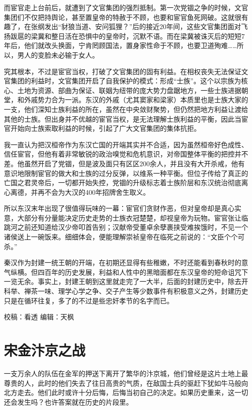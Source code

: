 \documentclass[
]{book}
\begin{document}
而宦官走上台前后，就遭到了文官集团的强烈抵制。第一次党锢之争的时候，文官集团们不仅把持舆论，甚至置皇帝的特赦于不顾，也要和宦官鱼死网破。这就很有趣了，在张纲发出``豺狼当道、安问狐狸？''后的接近20年间，这些文官集团面对飞扬跋扈的梁冀和整日活在恐惧中的皇帝时，沉默不语。而在梁冀被诛灭后的短短7年后，他们就改头换面，宁肯罔顾国法，置身家性命于不顾，也要卫道殉难\ldots\ldots 所以，男人的变脸未必输于女人。

究其根本，不过是宦官当权，打破了文官集团的固有利益。在相权丧失无法保证文官集团的利益时，文官集团开启了自我保护的模式：形成``士族''。这个以宗族为核心、土地为资源、部曲为保证、联姻为纽带的庞大势力盘踞地方，一些士族进据朝堂，和外戚势力合为一派。东汉的外戚（尤其窦家和梁家）本质里也是士族大家的一支，他们深知士族利益的所在，虽然在中央敛财聚势，但仍然把地方利益让渡给其他的士族。但出身并不优越的宦官当权，是无法理解士族利益的平衡，因此当宦官开始向士族索取利益的时候，引起了广大文官集团的集体抗拒。

我一直认为把汉桓帝作为东汉亡国的开端其实并不合适，因为虽然桓帝好色成性、信任宦官，但他有着非常敏锐的政治嗅觉和危机意识，对帝国整体平衡的把控并不差。他虽然开启了党锢，但是波及面只有区区200余人，并且没有大开杀戒，他有意识地限制宦官的做大和士族的过分反弹，以维系一种平衡。但位子传给了真正的亡国之君灵帝后，一切都开始失控，党锢的升级标志着士族阶层和东汉统治彻底离心离德，并再不会为大汉的400年招牌舍生取义。

所以东汉末年出现了很值得玩味的一幕：宦官们贪财作恶，但对皇帝却是真心实意，大部分有分量能决定历史走势的士族衣冠楚楚，却视皇帝为玩物。宦官张让临跳河之前还知道给汉少帝叩首告别；汉献帝受董卓余孽裹挟受难挨饿时，不见一个诸侯送上一碗饭来。细细体会，便能理解崇祯皇帝在临死之前说的：``文臣个个可杀。''

秦汉作为封建一统王朝的开端，在初期还显得有些稚嫩，不时还能看到春秋时的意气纵横。但四百年的历史发展，利益和人性中的黑暗面都在东汉皇帝的短命诅咒下一览无余。事实上，封建王朝到这里就走完了一大半，后面的封建历史中，除去开科举、禅茶一味、理学心学之争、交子产生等少数事件有积极意义之外，封建历史只是在循环往复，多了的不过是些忠奸孝节的名字而已。

校稿：看透
编辑：天枫

\hypertarget{ux5b8bux91d1ux6c74ux4eacux4e4bux6218}{%
\section{宋金汴京之战}\label{ux5b8bux91d1ux6c74ux4eacux4e4bux6218}}

一支万余人的队伍在金军的押送下离开了繁华的汴京城，他们曾经是这片土地上最尊贵的人，此时的他们失去了往日高贵的气质，在敌国士兵的驱赶下犹如牛马般向北方走去。他们此时或许十分后悔，后悔当初自己的决定。如果历史重来，这一切还会发生吗？也许答案就在历史的片段里。
\end{document}
